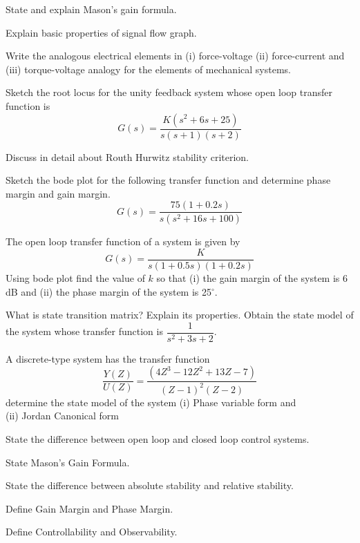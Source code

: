 \newpage \again

\partC

\item \iitem \iitem State and explain Mason's gain formula.
\item Explain basic properties of signal flow graph.
\ene
\Or
\item Write the analogous electrical elements in
  (i) force-voltage (ii) force-current and (iii) torque-voltage
  analogy for the elements of mechanical systems.
\ene

\item \iitem Sketch the root locus for the unity feedback system whose
  open loop transfer function is
  \[ G(s) = \dfrac{K(s^2 + 6s + 25)}{s (s + 1) (s + 2)}\]
\Or
\item Discuss in detail about Routh Hurwitz stability criterion.
\ene

\item \iitem Sketch the bode plot for the following transfer function
  and determine phase margin and gain margin.
  \[ G(s) = \dfrac{75 (1 + 0.2s)}{s (s^2 + 16s + 100)}\]
\Or
\item The open loop transfer function of a system is given by
  \[ G(s) = \dfrac{K}{s (1 + 0.5s) ( 1 + 0.2s)}\]
  Using bode plot find the value of $k$ so that (i) the gain margin of
  the system is 6 dB and (ii) the phase margin of the system is 25$^\circ$.
\ene

\item \iitem What is state transition matrix? Explain its properties. Obtain
  the state model of the system whose transfer function is
  $\dfrac {1}{s^2 + 3s + 2}$.
\Or
\item A discrete-type system has the transfer function
  \[ \dfrac{Y(Z)}{U(Z)} = \dfrac{(4Z^3 - 12Z^2 + 13Z - 7)}{(Z-1)^2(Z-2)} \]
  determine the state model of the system (i) Phase variable form and \\(ii)
  Jordan Canonical form
\ene

\markC
\ene

\newpage

\sub{\subj}

\maxtime
\partA

\iitem State the difference between open loop and closed loop control systems.
\item State Mason's Gain Formula.
\item State the difference between absolute stability and relative stability.
\item Define Gain Margin and Phase Margin.
\item Define Controllability and Observability.

